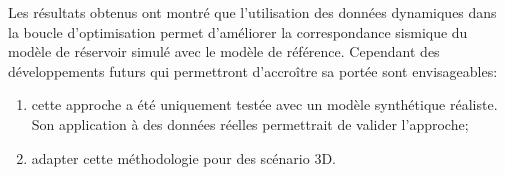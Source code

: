 Les résultats obtenus ont montré que l'utilisation des données dynamiques
dans la boucle d'optimisation permet d'améliorer la correspondance sismique du
modèle de réservoir simulé avec le modèle de référence. Cependant des
développements futurs qui permettront d'accroître sa portée sont envisageables:
\begin{enumerate}[-]
\item cette approche a été uniquement testée avec un modèle synthétique réaliste.
Son application à des données réelles permettrait de valider l'approche;
\item adapter cette méthodologie pour des scénario 3D.
\end{enumerate}
